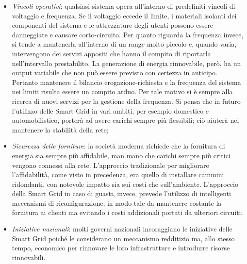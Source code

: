 \begin{itemize}
\item \textit{Vincoli operativi}: qualsiasi sistema opera all'interno di predefiniti vincoli di voltaggio e frequenza. Se il voltaggio eccede il limite, i materiali isolanti dei componenti del sistema e le attrezzature degli utenti possono essere danneggiate e causare corto-circuito. \newline Per quanto riguarda la frequenza invece, si tende a mantenerla all'interno di un range molto piccolo e, quando varia, intervengono dei servizi appositi che hanno il compito di riportarla nell'intervallo prestabilito. \newline
La generazione di energia rinnovabile, però, ha un output variabile che non può essere previsto con certezza in anticipo. Pertanto mantenere il bilancio erogazione-richiesta e la frequenza del sistema nei limiti risulta essere un compito arduo. Per tale motivo si è sempre alla ricerca di nuovi servizi per la gestione della frequenza. \newline Si pensa che in futuro l'utilizzo delle Smart Grid in vari ambiti, per esempio domestico e automobilistico, porterà ad avere carichi sempre più flessibili; ciò aiuterà nel mantenere la stabilità della rete;

\item \textit{Sicurezza delle forniture}: la società moderna richiede che la fornitura di energia sia sempre più affidabile, man mano che carichi sempre più critici vengono connessi alla rete. L'approccio tradizionale per migliorare l'affidabilità, come visto in precedenza, era quello di installare cammini ridondanti, con notevole impatto sia sui costi che sull'ambiente. \newline L'approccio della Smart Grid in caso di guasti, invece, prevede l'utilizzo di intelligenti meccanismi di riconfigurazione, in modo tale da mantenere costante la fornitura ai clienti ma evitando i costi addizionali portati da ulteriori circuiti;
\item \textit{Iniziative nazionali}: molti governi nazionali incoraggiano le iniziative delle Smart Grid poiché le considerano un meccanismo redditizio ma, allo stesso tempo, economico per rinnovare le loro infrastrutture e introdurre risorse rinnovabili.
\end{itemize}

